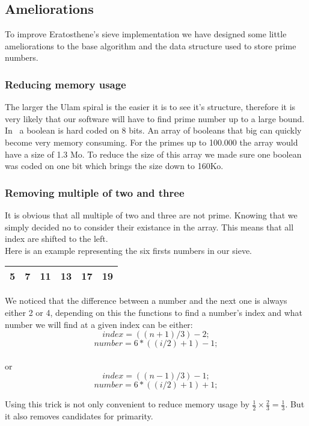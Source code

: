 \subsection{Ameliorations}

To improve Eratosthene's sieve implementation we have designed some little ameliorations to the base algorithm and the data structure used to store prime numbers.

\subsubsection{Reducing memory usage}
The larger the Ulam spiral is the easier it is to see it's structure, therefore it is very likely that our software will have to find prime number up to a large bound.\\In \CXX~a boolean is hard coded on 8 bits. An array of booleans that big can quickly become very memory consuming. For the primes up to 100.000 the array would have a size of 1.3 Mo. To reduce the size of this array we made sure one boolean was coded on one bit which brings the size down to 160Ko.

\subsubsection{Removing multiple of two and three }
It is obvious that all multiple of two and three are not prime. Knowing that we simply decided no to consider their existance in the array. This means that all index are shifted to the left.\\ Here is an example representing the six firsts numbers in our sieve.

\begin{center}
   \begin{tabular}{ |*{6}{c|} }
     \hline
     5 & 7 & 11 & 13 & 17 & 19 \\ \hline
     
   \end{tabular}
\end{center}  

 We noticed that the difference between a number and the next one is always either 2 or 4, depending on this the functions to find a number's index and what number we will find at a given index can be either: $$index = ((n + 1) / 3) - 2;$$ $$number = 6 * ((i / 2) + 1) - 1;$$ \\or $$index = ((n - 1) / 3) - 1;$$ $$number = 6 * ((i / 2) + 1) + 1;$$

Using this trick is not only convenient to reduce memory usage by $\frac{1}{2}\times\frac{2}{3} = \frac{1}{3}$. But it also removes candidates for primarity. 


